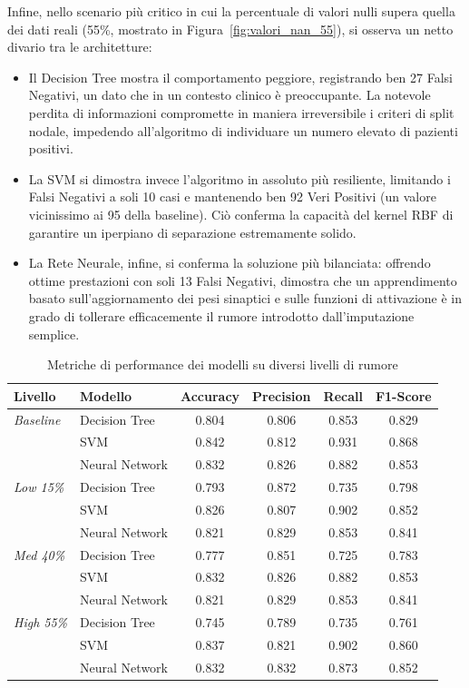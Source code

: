 \documentclass[12pt]{article}
\begin{document}
Infine, nello scenario più critico in cui la percentuale di valori nulli supera quella dei dati reali (55\%, mostrato in Figura~\ref{fig:valori_nan_55}), si osserva un netto divario tra le architetture: 
\begin{itemize}
    \item Il Decision Tree mostra il comportamento peggiore, registrando ben 27 Falsi Negativi, un dato che in un contesto clinico è preoccupante. La notevole perdita di informazioni compromette in maniera irreversibile i criteri di split nodale, impedendo all'algoritmo di individuare un numero elevato di pazienti positivi.
    \item La SVM si dimostra invece l'algoritmo in assoluto più resiliente, limitando i Falsi Negativi a soli 10 casi e mantenendo ben 92 Veri Positivi (un valore vicinissimo ai 95 della baseline). Ciò conferma la capacità del kernel RBF di garantire un iperpiano di separazione estremamente solido.
    \item La Rete Neurale, infine, si conferma la soluzione più bilanciata: offrendo ottime prestazioni con soli 13 Falsi Negativi, dimostra che un apprendimento basato sull'aggiornamento dei pesi sinaptici e sulle funzioni di attivazione è in grado di tollerare efficacemente il rumore introdotto dall'imputazione semplice.
\end{itemize}


\begin{table}[H]
\centering
\begin{tabular}{llcccc}
\toprule
\textbf{Livello} & \textbf{Modello} & \textbf{Accuracy} & \textbf{Precision} & \textbf{Recall} & \textbf{F1-Score} \\
\midrule
\textit{Baseline} & Decision Tree  & 0.804 & 0.806 & 0.853 & 0.829 \\
                  & SVM            & 0.842 & 0.812 & 0.931 & 0.868 \\
                  & Neural Network & 0.832 & 0.826 & 0.882 & 0.853 \\
\midrule
\textit{Low 15\%} & Decision Tree  & 0.793 & 0.872 & 0.735 & 0.798 \\
                  & SVM            & 0.826 & 0.807 & 0.902 & 0.852 \\
                  & Neural Network & 0.821 & 0.829 & 0.853 & 0.841 \\
\midrule
\textit{Med 40\%} & Decision Tree  & 0.777 & 0.851 & 0.725 & 0.783 \\
                  & SVM            & 0.832 & 0.826 & 0.882 & 0.853 \\
                  & Neural Network & 0.821 & 0.829 & 0.853 & 0.841 \\
\midrule
\textit{High 55\%}& Decision Tree  & 0.745 & 0.789 & 0.735 & 0.761 \\
                  & SVM            & 0.837 & 0.821 & 0.902 & 0.860 \\
                  & Neural Network & 0.832 & 0.832 & 0.873 & 0.852 \\
\bottomrule
\end{tabular}
\caption{Metriche di performance dei modelli su diversi livelli di rumore}
\label{tab:metriche_finali}
\end{table}
\end{document}
